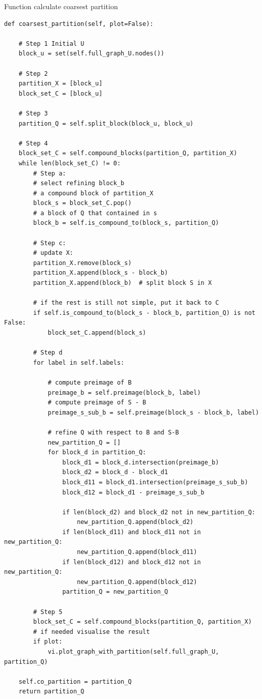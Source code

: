 \begin{code}
\caption{Function calculate coarsest partition}
\label{lst:coarsest part}
\begin{verbatim}
def coarsest_partition(self, plot=False):

    # Step 1 Initial U 
    block_u = set(self.full_graph_U.nodes())
    
    # Step 2
    partition_X = [block_u]
    block_set_C = [block_u]
    
    # Step 3
    partition_Q = self.split_block(block_u, block_u)
    
    # Step 4
    block_set_C = self.compound_blocks(partition_Q, partition_X)
    while len(block_set_C) != 0:
        # Step a:
        # select refining block_b
        # a compound block of partition_X
        block_s = block_set_C.pop()  
        # a block of Q that contained in s
        block_b = self.is_compound_to(block_s, partition_Q)  

        # Step c:
        # update X:
        partition_X.remove(block_s)
        partition_X.append(block_s - block_b)
        partition_X.append(block_b)  # split block S in X

        # if the rest is still not simple, put it back to C
        if self.is_compound_to(block_s - block_b, partition_Q) is not False:
            block_set_C.append(block_s)
        
        # Step d
        for label in self.labels:

            # compute preimage of B
            preimage_b = self.preimage(block_b, label)
            # compute preimage of S - B
            preimage_s_sub_b = self.preimage(block_s - block_b, label)

            # refine Q with respect to B and S-B
            new_partition_Q = []
            for block_d in partition_Q:
                block_d1 = block_d.intersection(preimage_b)
                block_d2 = block_d - block_d1
                block_d11 = block_d1.intersection(preimage_s_sub_b)
                block_d12 = block_d1 - preimage_s_sub_b

                if len(block_d2) and block_d2 not in new_partition_Q:
                    new_partition_Q.append(block_d2)
                if len(block_d11) and block_d11 not in new_partition_Q:
                    new_partition_Q.append(block_d11)
                if len(block_d12) and block_d12 not in new_partition_Q:
                    new_partition_Q.append(block_d12)
                partition_Q = new_partition_Q
        
        # Step 5
        block_set_C = self.compound_blocks(partition_Q, partition_X)
        # if needed visualise the result
        if plot:
            vi.plot_graph_with_partition(self.full_graph_U, partition_Q)

    self.co_partition = partition_Q
    return partition_Q
\end{verbatim}
\end{code}



